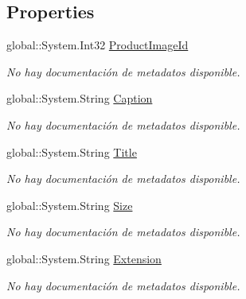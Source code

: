 \subsection*{Properties}
\begin{DoxyCompactItemize}
\item 
global\-::\-System.\-Int32 \hyperlink{class_game_memory_1_1_product_images_a8a6332671d553f887bcc162b3882550b}{Product\-Image\-Id}
\begin{DoxyCompactList}\small\item\em No hay documentación de metadatos disponible. \end{DoxyCompactList}\item 
global\-::\-System.\-String \hyperlink{class_game_memory_1_1_product_images_aa11d5ca8f121efddb63bddd14530cfb9}{Caption}
\begin{DoxyCompactList}\small\item\em No hay documentación de metadatos disponible. \end{DoxyCompactList}\item 
global\-::\-System.\-String \hyperlink{class_game_memory_1_1_product_images_a36f676489d4534cca829e8ee91b09619}{Title}
\begin{DoxyCompactList}\small\item\em No hay documentación de metadatos disponible. \end{DoxyCompactList}\item 
global\-::\-System.\-String \hyperlink{class_game_memory_1_1_product_images_a09eaad03141a7a6aee9bee592a826fbb}{Size}
\begin{DoxyCompactList}\small\item\em No hay documentación de metadatos disponible. \end{DoxyCompactList}\item 
global\-::\-System.\-String \hyperlink{class_game_memory_1_1_product_images_a3bb1f630d13a3acd2a74c75948ab7855}{Extension}
\begin{DoxyCompactList}\small\item\em No hay documentación de metadatos disponible. \end{DoxyCompactList}\item 

\end{DoxyCompactItemize}
